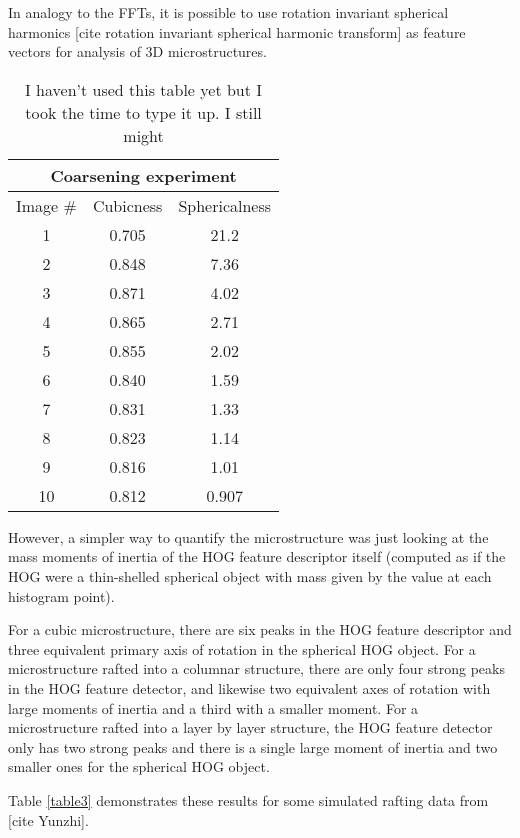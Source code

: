 \documentclass[review]{elsarticle}
\begin{document}
	In analogy to the FFTs, it is possible to use rotation invariant spherical harmonics [cite rotation invariant spherical harmonic transform] as feature vectors for analysis of 3D microstructures.
	
    \begin{table}[h]
      \begin{center}
      \begin{tabular}{ c | c | c }
        \multicolumn{3}{c}{Coarsening experiment} \\
        \hline
        Image \# & Cubicness & Sphericalness \\
        \hline
        1 & 0.705 & 21.2 \\
        2 & 0.848 & 7.36 \\
        3 & 0.871 & 4.02 \\
        4 & 0.865 & 2.71 \\
        5 & 0.855 & 2.02 \\
        6 & 0.840 & 1.59 \\
        7 & 0.831 & 1.33 \\
        8 & 0.823 & 1.14 \\
        9 & 0.816 & 1.01 \\
        10 & 0.812 & 0.907 \\
        \hline
      \end{tabular}
	  \label{table2}
	  \caption{I haven't used this table yet but I took the time to type it up. I still might }
	  \end{center}
  	\end{table}

    However, a simpler way to quantify the microstructure was just looking at the mass moments of inertia of the HOG feature descriptor itself (computed as if the HOG were a thin-shelled spherical object with mass given by the value at each histogram point).
	
	For a cubic microstructure, there are six peaks in the HOG feature descriptor and three equivalent primary axis of rotation in the spherical HOG object. For a microstructure rafted into a columnar structure, there are only four strong peaks in the HOG feature detector, and likewise two equivalent axes of rotation with large moments of inertia and a third with a smaller moment. For a microstructure rafted into a layer by layer structure, the HOG feature detector only has two strong peaks and there is a single large moment of inertia and two smaller ones for the spherical HOG object.
	
	Table \ref{table3} demonstrates these results for some simulated rafting data from [cite Yunzhi].
	
\end{document}
